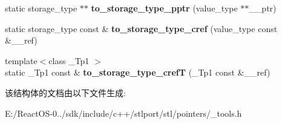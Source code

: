 \begin{DoxyCompactItemize}
static storage\+\_\+type $\ast$$\ast$ {\bfseries to\+\_\+storage\+\_\+type\+\_\+pptr} (value\+\_\+type $\ast$$\ast$\+\_\+\+\_\+ptr)
\item 
\mbox{\label{struct___cast_traits_a0dba9393cb229309b9a8fabab75ebb15}} 
static storage\+\_\+type const  \& {\bfseries to\+\_\+storage\+\_\+type\+\_\+cref} (value\+\_\+type const \&\+\_\+\+\_\+ref)
\item 
\mbox{\label{struct___cast_traits_a6088023a23cdba3d8eb8677746d26782}} 
{\footnotesize template$<$class \+\_\+\+Tp1 $>$ }\\static \+\_\+\+Tp1 const  \& {\bfseries to\+\_\+storage\+\_\+type\+\_\+crefT} (\+\_\+\+Tp1 const \&\+\_\+\+\_\+ref)
\end{DoxyCompactItemize}


该结构体的文档由以下文件生成\+:\begin{DoxyCompactItemize}
\item 
E\+:/\+React\+O\+S-\/0../sdk/include/c++/stlport/stl/pointers/\+\_\+tools.\+h\end{DoxyCompactItemize}
